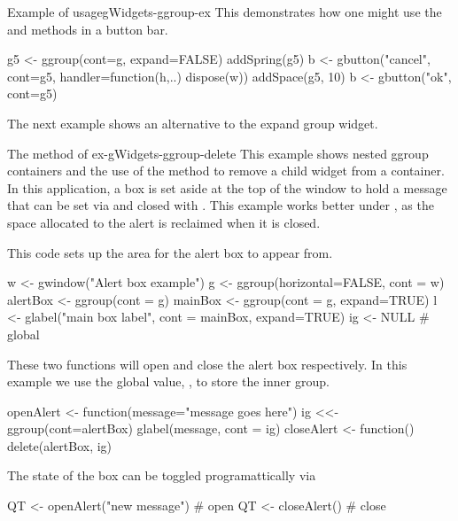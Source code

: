\begin{example}{Example of  usage}{gWidgets-ggroup-ex}
This demonstrates how one might use the  and 
methods in a button bar.
\begin{Schunk}
\begin{Sinput}
 g5 <- ggroup(cont=g, expand=FALSE)
 addSpring(g5)
 b  <- gbutton("cancel", cont=g5, handler=function(h,..) dispose(w))
 addSpace(g5, 10)
 b  <- gbutton("ok", cont=g5)
\end{Sinput}
\end{Schunk}
\end{example}

The next example shows an alternative to the expand group widget.

\begin{example}{The  method of }{ex-gWidgets-ggroup-delete}
This example shows nested ggroup containers and the use of the
 method to remove a child widget from a
container. In this application, a box is set aside at the top of the
window to hold a message that can be set via  and
closed with . This example works better under
, as the space allocated to the alert is reclaimed when
it is closed.


This code sets up the area for the alert box to appear from.
\begin{Schunk}
\begin{Sinput}
 w <- gwindow("Alert box example")
 g <- ggroup(horizontal=FALSE, cont = w)
 alertBox <- ggroup(cont = g)
 mainBox <- ggroup(cont = g, expand=TRUE)
 l <- glabel("main box label", cont = mainBox, expand=TRUE)
 ig <- NULL                              # global
\end{Sinput}
\end{Schunk}

These two functions will open and close the alert box respectively. In
this example we use the global value, , to store the inner group.
\begin{Schunk}
\begin{Sinput}
 openAlert <- function(message="message goes here") {
   ig <<- ggroup(cont=alertBox)
   glabel(message, cont = ig)
 }
 closeAlert <- function() delete(alertBox, ig)
\end{Sinput}
\end{Schunk}

The state of the box can be toggled programattically via
\begin{Schunk}
\begin{Sinput}
 QT <- openAlert("new message")                # open
 QT <- closeAlert()                            # close
\end{Sinput}
\end{Schunk}

\end{example}


